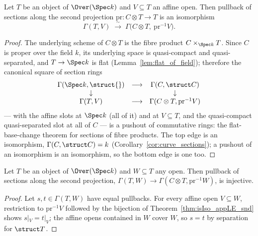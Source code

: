 \begin{theorem}
  \label{thm:isIso_appLE_snd}
  \leanok
  Let \(T\) be an object of \(\Over(\Spec k)\) and \(V \subseteq T\) an affine open. Then
  pullback of sections along the second projection
  \(\mathrm{pr} \colon C \otimes T \to T\) is an isomorphism
  \[ \Gamma(T, V) \;\xrightarrow{\ \sim\ }\; \Gamma\bigl(C \otimes T,\
     \mathrm{pr}^{-1}V\bigr). \]
\end{theorem}
\begin{proof}
  \leanok
  The underlying scheme of \(C \otimes T\) is the fibre product
  \(C \times_{\Spec k} T\). Since \(C\) is proper over the field \(k\), its underlying space
  is quasi-compact and quasi-separated, and \(T \to \Spec k\) is flat
  (Lemma~\ref{lem:flat_of_field}); therefore the canonical square of section rings
  \[ \begin{array}{ccc}
     \Gamma(\Spec k, \struct{}) & \longrightarrow & \Gamma(C, \struct C) \\
     \downarrow & & \downarrow \\
     \Gamma(T, V) & \longrightarrow & \Gamma(C \otimes T, \mathrm{pr}^{-1}V)
     \end{array} \]
  --- with the affine slots at \(\Spec k\) (all of it) and at \(V \subseteq T\), and the
  quasi-compact quasi-separated slot at all of \(C\) --- is a pushout of commutative rings:
  the flat-base-change theorem for sections of fibre products. The top edge is an
  isomorphism, \(\Gamma(C, \struct C) = k\) (Corollary~\ref{cor:curve_sections}); a pushout
  of an isomorphism is an isomorphism, so the bottom edge is one too.
\end{proof}

\begin{corollary}
  \label{cor:appLE_snd_injective}
  \leanok
  Let \(T\) be an object of \(\Over(\Spec k)\) and \(W \subseteq T\) any open. Then pullback
  of sections along the second projection,
  \(\Gamma(T, W) \to \Gamma(C \otimes T, \mathrm{pr}^{-1}W)\), is injective.
\end{corollary}
\begin{proof}
  \leanok
  Let \(s, t \in \Gamma(T,W)\) have equal pullbacks. For every affine open \(V \subseteq W\),
  restriction to \(\mathrm{pr}^{-1}V\) followed by the bijection of
  Theorem~\ref{thm:isIso_appLE_snd} shows \(s|_V = t|_V\); the affine opens contained in
  \(W\) cover \(W\), so \(s = t\) by separation for \(\struct T\).
\end{proof}

